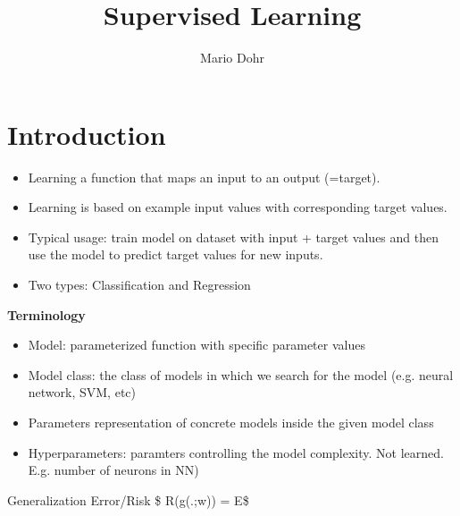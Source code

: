 \documentclass[10pt,a4paper]{article}
\author{Mario Dohr}
\title{Supervised Learning}
\begin{document}
\maketitle
\section{Introduction}
\begin{itemize}
\item Learning a function that maps an input to an output (=target).
\item Learning is based on example input values with corresponding target values.
\item Typical usage: train model on dataset with input + target values and then use the model to predict target values for new inputs.
\item Two types: Classification and Regression
\end{itemize}

\textbf{Terminology}
\begin{itemize}
\item Model: parameterized function with specific parameter values
\item Model class: the class of models in which we search for the model (e.g. neural network, SVM, etc)
\item Parameters representation of concrete models inside the given model class
\item Hyperparameters: paramters controlling the model complexity. Not learned. E.g. number of neurons in NN)
\end{itemize}

Generalization Error/Risk
\$ R(g(.;w)) = E\$
\end{document}
